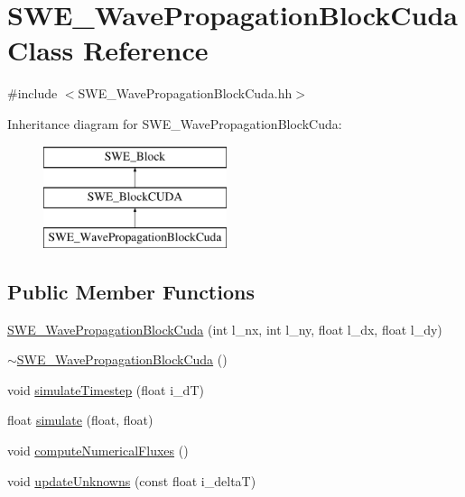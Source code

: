 \hypertarget{classSWE__WavePropagationBlockCuda}{\section{S\-W\-E\-\_\-\-Wave\-Propagation\-Block\-Cuda Class Reference}
\label{classSWE__WavePropagationBlockCuda}
}


{\ttfamily \#include $<$S\-W\-E\-\_\-\-Wave\-Propagation\-Block\-Cuda.\-hh$>$}

Inheritance diagram for S\-W\-E\-\_\-\-Wave\-Propagation\-Block\-Cuda\-:\begin{figure}[H]
\begin{center}
\leavevmode
\includegraphics[height=3.000000cm]{classSWE__WavePropagationBlockCuda}
\end{center}
\end{figure}
\subsection*{Public Member Functions}
\begin{DoxyCompactItemize}
\item 
\hyperlink{classSWE__WavePropagationBlockCuda_a82f9de16ebab1bff58ead034416ab9ef}{S\-W\-E\-\_\-\-Wave\-Propagation\-Block\-Cuda} (int l\-\_\-nx, int l\-\_\-ny, float l\-\_\-dx, float l\-\_\-dy)
\item 
\hyperlink{classSWE__WavePropagationBlockCuda_ab4ad10c9704b7f5501f2a1d828672b57}{$\sim$\-S\-W\-E\-\_\-\-Wave\-Propagation\-Block\-Cuda} ()
\item 
void \hyperlink{classSWE__WavePropagationBlockCuda_ab401d17ea7a60ff30219076bc85dc591}{simulate\-Timestep} (float i\-\_\-d\-T)
\item 
float \hyperlink{classSWE__WavePropagationBlockCuda_a8c0fbb70ad29f3775d35978bf2d5b396}{simulate} (float, float)
\item 
void \hyperlink{classSWE__WavePropagationBlockCuda_a8a89bf61b9fc4433652f400ca8e564ed}{compute\-Numerical\-Fluxes} ()
\item 
void \hyperlink{classSWE__WavePropagationBlockCuda_a4163045a47a73515841e754ca3859fc5}{update\-Unknowns} (const float i\-\_\-delta\-T)
\end{DoxyCompactItemize}
